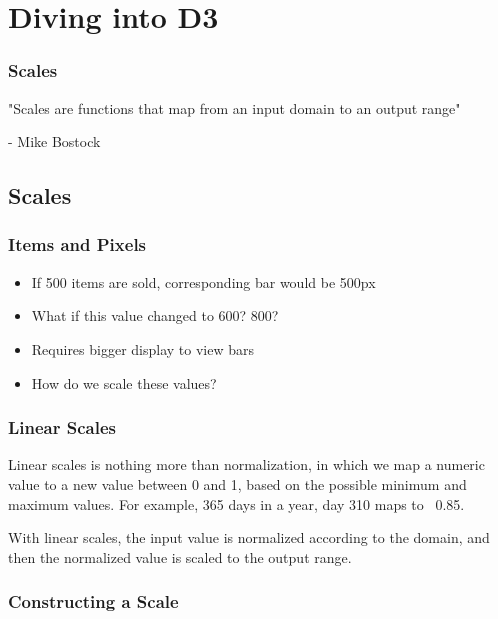 \documentclass[red]{beamer}
\begin{document}
\section[Outline]{}

\section{Diving into D3}

\begin{frame}
    \frametitle{Scales}
    "Scales are functions that map from an input domain to an output range"

    \hspace{0.9cm} - Mike Bostock 
\end{frame}


\subsection{Scales}

\begin{frame}
  \frametitle{Items and Pixels}   %
  \lstl

  \begin{itemize}
  \item<1-> If 500 items are sold, corresponding bar would be 500px
  \item<2-> What if this value changed to 600? 800?
  \item<3-> Requires bigger display to view bars
  \item<4-> How do we scale these values?
  \end{itemize}
\end{frame}

\begin{frame}
  \frametitle{Linear Scales}
  Linear scales is nothing more than normalization, in which we map a numeric value to a 
  new value between 0 and 1, based on the possible minimum and maximum values. For example, 
  365 days in a year, day 310 maps to ~0.85. 
  \newline

  With linear scales, the input value is normalized according to the domain, and then the 
  normalized value is scaled to the output range. 
\end{frame}

\begin{frame}
  \frametitle{Constructing a Scale}
  \lstll
\end{frame}
\end{document}

